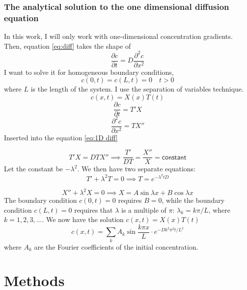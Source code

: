 \documentclass{article}
\begin{document}
\subsubsection{The analytical solution to the one dimensional diffusion equation}\label{analytical solution}
In this work, I will only work with one-dimensional concentration gradients. Then, equation \ref{eq:diff} takes the shape of
\begin{equation}\label{eq:1D diff}
\frac{\partial c}{\partial t} = D\frac{\partial^2 c}{\partial x^2}
\end{equation}
I want to solve it for homogeneous boundary conditions, 
$$c(0,t) = c(L,t)=0 \quad t>0$$ where $L$ is the length of the system. I use the separation of variables technique. 
\begin{equation*}
c(x,t) = X(x)T(t)
\end{equation*}
\begin{equation*}
\frac{\partial c}{\partial t} = T'X
\end{equation*}
\begin{equation*}
\frac{\partial^2 c}{\partial x^2} = TX''
\end{equation*}
Inserted into the equation \ref{eq:1D diff}

\begin{equation*}
T'X  = DTX''\implies \frac{T'}{DT} = \frac{X''}{X} =\mathsf{ constant}
\end{equation*}
Let the constant be $-\lambda ^2$. We then have two separate equations:
\begin{equation*}
T' + \lambda^2 T = 0 \implies T=e^{-\lambda^2 tD}
\end{equation*}

\begin{equation*}
X'' + \lambda^2X = 0 \implies X=A \sin \lambda x + B\cos \lambda x
\end{equation*}
The boundary condition $c(0,t) = 0$ requires $B=0$, while the boundary condition $c(L,t)=0$ requires that $\lambda$ is a multiple of $\pi$: $\lambda_k = k\pi /L$, where $k = 1,2,3,...$. 
We now have the solution $c(x,t)=X(x)T(t)$
\begin{equation}\label{eq:c(x,t)}
c(x,t) = \sum_k A_k \sin \frac{k \pi x}{L}\cdot e^{-Dk^2\pi^2 t /L^2}
\end{equation}
where $A_k$ are the Fourier coefficients of the initial concentration.


\section{Methods}
\end{document}
